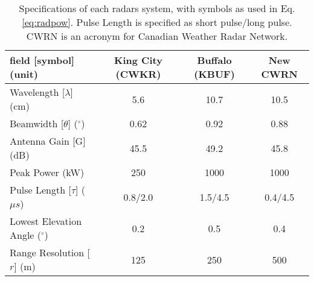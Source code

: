 \begin{table}[h]
    \caption{Specifications of each radars system, with symbols as used in Eq. \ref{eq:radpow}. Pulse Length is specified as short pulse/long pulse. CWRN is an acronym for Canadian Weather Radar Network.}\label{radarspecs}
    \begin{center}
    \begin{tabular}{|l|c|c|c|}
    \hline
     field [symbol](unit) & King City (CWKR) & Buffalo (KBUF) & New CWRN \\
    \hline\hline
    Wavelength [$\lambda$](cm) & 5.6  & 10.7 & 10.5\\
    \hline
    Beamwidth [$\theta$] ($^\circ$)  & 0.62  & 0.92 & 0.88 \\
    \hline
     Antenna Gain [G] (dB) & 45.5 & 49.2 & 45.8\\
    \hline
     Peak Power (kW) & 250 & 1000 & 1000 \\
    \hline
     Pulse Length [$\tau$] ($\mu s$) &  0.8/2.0 & 1.5/4.5 & 0.4/4.5 \\
    \hline
     Lowest Elevation Angle ($^\circ$) & 0.2 & 0.5 & 0.4 \\
    \hline
     Range Resolution [$r$] (m)& 125 & 250 & 500 \\
    \hline
    \end{tabular}
    \end{center}
\end{table}



